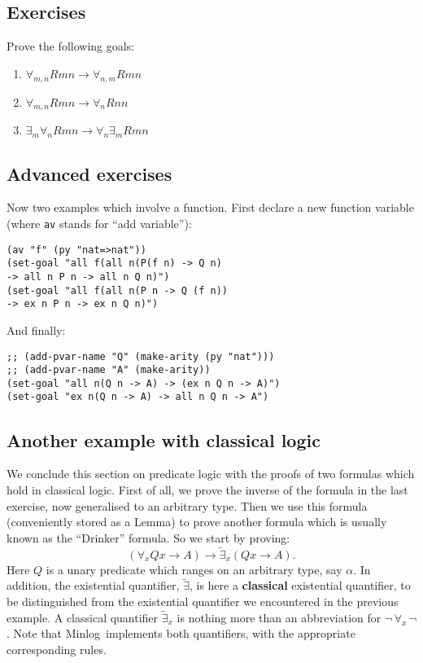 \documentclass[12pt]{amsart}
\newcommand{\excl}{\tilde{\exists}} %
\newcommand{\inquotes}[1]{``#1''}
\newcommand{\mi}{Minlog}
\begin{document}
\subsection{Exercises}
Prove the following goals:
\begin{enumerate}
\item $\forall_{m,n} R m n \to \forall_{n,m} R m n$
\item $\forall_{m, n} R m n \to \forall_n R n n$
\item $\exists_m \forall_n R m n  \to \forall_n \exists_m R m n$
\end{enumerate}


\subsection{Advanced exercises}
Now two examples which involve a function.  First declare a new
function variable (where \texttt{av} stands for \inquotes{add
  variable}):
\begin{verbatim}
(av "f" (py "nat=>nat"))
(set-goal "all f(all n(P(f n) -> Q n)
-> all n P n -> all n Q n)")
(set-goal "all f(all n(P n -> Q (f n))
-> ex n P n -> ex n Q n)")
\end{verbatim}

And finally:
\begin{verbatim}
;; (add-pvar-name "Q" (make-arity (py "nat")))
;; (add-pvar-name "A" (make-arity))
(set-goal "all n(Q n -> A) -> (ex n Q n -> A)")
(set-goal "ex n(Q n -> A) -> all n Q n -> A")
\end{verbatim}


\subsection{Another example with classical logic}
We conclude this section on predicate logic with the proofs of two
formulas which hold in classical logic.  First of all, we prove the
inverse of the formula in the last exercise, now generalised to an
arbitrary type.  Then we use this formula (conveniently stored as a
Lemma) to prove another formula which is usually known as the
\inquotes{Drinker} formula.  So we start by proving:
\begin{equation*}
  (\forall_x Q x \to A) \to \excl_x (Q x \to A).
\end{equation*}
Here $Q$ is a unary predicate which ranges on an arbitrary type, say
$\alpha$.  In addition, the existential quantifier, $\excl$, is here a
\textbf{classical} existential quantifier, to be distinguished from
the existential quantifier we encountered in the previous example. A
classical quantifier $\excl_x$ is nothing more than an abbreviation
for $\lnot\, \forall_x\, \lnot$.  Note that \mi\ implements both
quantifiers, with the appropriate corresponding rules.
\end{document}

